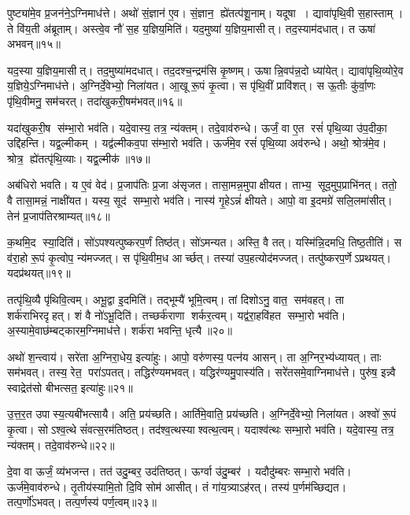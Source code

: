 पुष्ट्या॑मे॒व प्र॒जन॑ने॒ऽग्निमाध॑त्ते।
अथो॑ सं॒ज्ञान॑ ए॒व।
सं॒ज्ञान॒ ह्ये॑तत्प॑शू॒नाम्।
यदूषा।
द्यावा॑पृथि॒वी स॒हास्ताम्।
ते वि॑य॒ती अ॑ब्रूताम्।
अस्त्वे॒व नौ॑ स॒ह य॒ज्ञिय॒मिति॑।
यद॒मुष्या॑ य॒ज्ञिय॒मासीत्।
तद॒स्याम॑दधात्।
त ऊषा॑ अभवन्॥१५॥

यद॒स्या य॒ज्ञिय॒मासीत्।
तद॒मुष्या॑मदधात्।
तद॒दश्च॒न्द्रम॑सि कृ॒ष्णम्।
ऊषान्नि॒वप॑न्न॒दो ध्या॑येत्।
द्यावा॑पृथि॒व्योरे॒व य॒ज्ञिये॒ऽग्निमाध॑त्ते।
अ॒ग्निर्दे॒वेभ्यो॒ निला॑यत।
आ॒खू रू॒पं कृ॒त्वा।
स पृ॑थि॒वीं प्रावि॑शत्।
स ऊ॒तीः कु॑र्वा॒णः पृ॑थि॒वीमनु॒ सम॑चरत्।
तदा॑खुकरी॒षम॑भवत्॥१६॥

यदा॑खुकरी॒ष स॑म्भा॒रो भव॑ति।
यदे॒वास्य॒ तत्र॒ न्य॑क्तम्।
तदे॒वाव॑रुन्धे।
ऊर्जं॒ वा ए॒त रसं॑ पृथि॒व्या उ॑प॒दीका॒ उद्दि॑हन्ति।
यद्व॒ल्मीकम्।
यद्व॑ल्मीकव॒पा स॑म्भा॒रो भव॑ति।
ऊर्ज॑मे॒व रसं॑ पृथि॒व्या अव॑रुन्धे।
अथो॒ श्रोत्र॑मे॒व।
श्रोत्र॒ ह्ये॑तत्पृ॑थि॒व्याः।
यद्व॒ल्मीक॑॥१७॥

अब॑धिरो भवति।
य ए॒वं वेद॑।
प्र॒जाप॑तिः प्र॒जा अ॑सृजत।
तासा॒मन्न॒मुपाक्षीयत।
ताभ्य॒ सूद॒मुप॒प्राभि॑नत्।
ततो॒ वै तासा॒मन्नं॒ नाक्षी॑यत।
यस्य॒ सूद॑ सम्भा॒रो भव॑ति।
नास्य॑ गृ॒हेऽन्नं॑ क्षीयते।
आपो॒ वा इ॒दमग्रे॑ सलि॒लमा॑सीत्।
तेन॑ प्र॒जाप॑तिरश्राम्यत्॥१८॥

क॒थमि॒द स्या॒दिति॑।
सो॑ऽपश्यत्पुष्करप॒र्णं तिष्ठ॑त्।
सो॑ऽमन्यत।
अस्ति॒ वै तत्।
यस्मि॑न्नि॒दमधि॒ तिष्ठ॒तीति॑।
स व॑रा॒हो रू॒पं कृ॒त्वोप॒ न्य॑मज्जत्।
स पृ॑थि॒वीम॒ध आर्च्छत्।
तस्या॑ उप॒हत्योद॑मज्जत्।
तत्पु॑ष्करप॒र्णेऽप्रथयत्।
यदप्र॑थयत्॥१९॥

तत्पृ॑थि॒व्यै पृ॑थिवि॒त्वम्।
अभू॒द्वा इ॒दमिति॑।
तद्भूम्यै॑ भूमि॒त्वम्।
तां दिशोऽनु॒ वात॒ सम॑वहत्।
ता शर्क॑राभिरदृहत्।
शं वै नो॑ऽभू॒दिति॑।
तच्छर्क॑राणा शर्कर॒त्वम्।
यद्व॑रा॒हवि॑हत सम्भा॒रो भव॑ति।
अ॒स्यामे॒वाछ॑म्बट्कारम॒ग्निमाध॑त्ते।
शर्क॑रा भवन्ति॒ धृत्यै॥२०॥

अथो॑ श॒न्त्वाय॑।
सरे॑ता अ॒ग्निरा॒धेय॒ इत्या॑हुः।
आपो॒ वरु॑णस्य॒ पत्न॑य आसन्।
ता अ॒ग्निर॒भ्य॑ध्यायत्।
ताः सम॑भवत्।
तस्य॒ रेत॒ परा॑ऽपतत्।
तद्धिर॑ण्यमभवत्।
यद्धिर॑ण्यमु॒पास्य॑ति।
सरे॑तसमे॒वाग्निमाध॑त्ते।
पुरु॑ष॒ इन्न्वै स्वाद्रेत॑सो बीभत्सत॒ इत्या॑हुः॥२१॥

उ॒त्त॒र॒त उपास्य॒त्यबी॑भत्सायै।
अति॒ प्रय॑च्छति।
आर्ति॑मे॒वाति॒ प्रय॑च्छति।
अ॒ग्निर्दे॒वेभ्यो॒ निला॑यत।
अश्वो॑ रू॒पं कृ॒त्वा।
सोऽश्व॒त्थे सं॑वत्स॒रम॑तिष्ठत्।
तद॑श्व॒त्थस्याश्वत्थ॒त्वम्।
यदाश्व॑त्थः सम्भा॒रो भव॑ति।
यदे॒वास्य॒ तत्र॒ न्य॑क्तम्।
तदे॒वाव॑रुन्धे॥२२॥

दे॒वा वा ऊर्जं॒ व्य॑भजन्त।
तत॑ उदु॒म्बर॒ उद॑तिष्ठत्।
ऊर्ग्वा उ॑दु॒म्बर॑।
यदौदु॑म्बरः सम्भा॒रो भव॑ति।
ऊर्ज॑मे॒वाव॑रुन्धे।
तृ॒तीय॑स्यामि॒तो दि॒वि सोम॑ आसीत्।
तं गा॑य॒त्र्याऽह॑रत्।
तस्य॑ प॒र्णम॑च्छिद्यत।
तत्प॒र्णो॑ऽभवत्।
तत्प॒र्णस्य॑ पर्ण॒त्वम्॥२३॥

